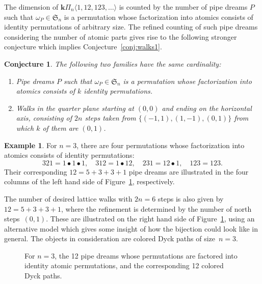 \documentclass{amsart}
\newtheorem{conjecture}[theorem]{Conjecture}
\theoremstyle{definition}
\newtheorem{example}[theorem]{Example}
\newcommand{\bk}{\mathbf{k}} %
\newcommand{\fref}[1]{Figure~\ref{#1}} %
\newcommand{\fS}{\mathfrak{S}} %
\newcommand{\pipeDreams}{\Pi} %
\newcommand{\HP}{{\bk\pipeDreams}} %
\begin{document}
The dimension of $\HP_n \langle 1, 12, 123, \dots \rangle$ is counted by the number of pipe dreams $P$ such that $\omega_P\in \fS_n$ is a permutation whose factorization into atomics consists of identity permutations of arbitrary size. The refined counting of such pipe dreams considering the number of atomic parts gives rise to the following stronger conjecture which implies Conjecture~\ref{conj:walks1}.

\begin{conjecture}
\label{conj:walks2}
The following two families have the same cardinality:
\begin{enumerate}
\item Pipe dreams $P$ such that $\omega_P\in \fS_n$ is a permutation whose factorization into atomics consists of $k$ identity permutations.
\item Walks in the quarter plane starting at $(0,0)$ and ending on the horizontal axis, consisting of $2n$ steps taken from $\{(-1, 1), (1, -1), (0, 1)\}$ from which $k$ of them are $(0,1)$. 
\end{enumerate}
\end{conjecture}
 
\begin{example}
For $n=3$, there are four permutations whose factorization into atomics consists of identity permutations:
\[
321=1\bullet 1\bullet 1, \quad 312=1\bullet 12, \quad 231=12\bullet 1, \quad 123 = 123. 
\]
Their corresponding $12 = 5+3+3+1$ pipe dreams are illustrated in the four columns of the left hand side of \fref{fig:pipe_walks}, respectively.
 
The number of desired lattice walks with $2n = 6$ steps is also given by $12 = 5+3+3+1$, where the refinement is determined by the number of north steps~$(0,1)$. 
These are illustrated on the right hand side of \fref{fig:pipe_walks}, using an alternative model which gives some insight of how the bijection could look like in general. 
The objects in consideration are colored Dyck paths of size~$n = 3$.
\end{example}

\begin{figure}[ht]
	\capstart
	\centerline{ \quad }
	\caption{For $n=3$, the 12 pipe dreams whose permutations are factored into identity atomic permutations, and the corresponding 12 colored Dyck paths.}
	\label{fig:pipe_walks}
\end{figure}
\end{document}
